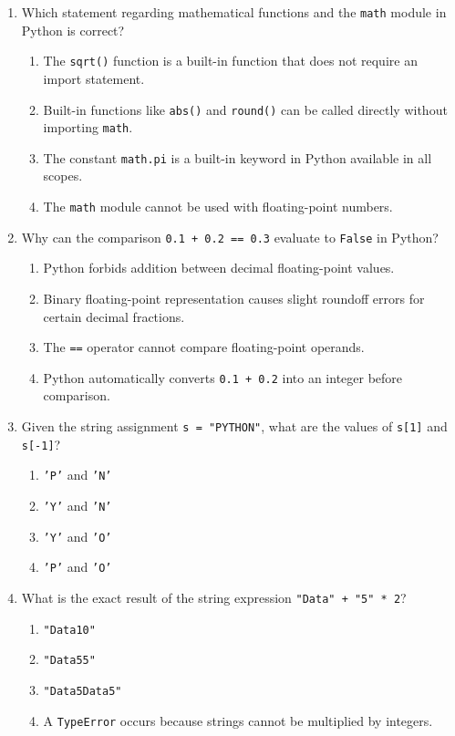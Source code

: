 \documentclass[11pt,a4paper]{article}
\begin{document}
\begin{enumerate}[label=\textbf{Q\arabic*.},leftmargin=2em,itemsep=2pt,topsep=1pt,resume]

\item Which statement regarding mathematical functions and the \texttt{math} module in Python is correct?
\begin{enumerate}[label=\Alph*.,leftmargin=2em]
  \item The \texttt{sqrt()} function is a built-in function that does not require an import statement.
  \item Built-in functions like \texttt{abs()} and \texttt{round()} can be called directly without importing \texttt{math}.
  \item The constant \texttt{math.pi} is a built-in keyword in Python available in all scopes.
  \item The \texttt{math} module cannot be used with floating-point numbers.
\end{enumerate}

\item Why can the comparison \texttt{0.1 + 0.2 == 0.3} evaluate to \texttt{False} in Python?
\begin{enumerate}[label=\Alph*.,leftmargin=2em]
  \item Python forbids addition between decimal floating-point values.
  \item Binary floating-point representation causes slight roundoff errors for certain decimal fractions.
  \item The \texttt{==} operator cannot compare floating-point operands.
  \item Python automatically converts \texttt{0.1 + 0.2} into an integer before comparison.
\end{enumerate}

\item Given the string assignment \texttt{s = "PYTHON"}, what are the values of \texttt{s[1]} and \texttt{s[-1]}?
\begin{enumerate}[label=\Alph*.,leftmargin=2em]
  \item \texttt{'P'} and \texttt{'N'}
  \item \texttt{'Y'} and \texttt{'N'}
  \item \texttt{'Y'} and \texttt{'O'}
  \item \texttt{'P'} and \texttt{'O'}
\end{enumerate}

\item What is the exact result of the string expression \texttt{"Data" + "5" * 2}?
\begin{enumerate}[label=\Alph*.,leftmargin=2em]
  \item \texttt{"Data10"}
  \item \texttt{"Data55"}
  \item \texttt{"Data5Data5"}
  \item A \texttt{TypeError} occurs because strings cannot be multiplied by integers.
\end{enumerate}


\end{enumerate}
\end{document}
